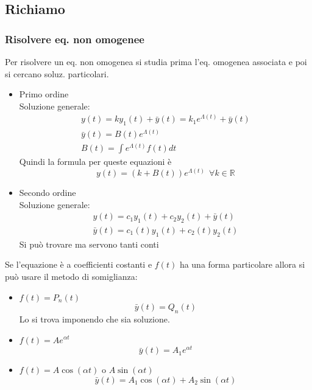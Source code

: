 \subsection{Richiamo}

\subsubsection{Risolvere eq. non omogenee}
Per risolvere un eq. non omogenea si studia prima l'eq. omogenea associata e poi si cercano soluz. particolari.
\begin{itemize}
    \item Primo ordine \\
        Soluzione generale:
        \begin{gather*}
            y(t) = ky_1(t)+ \bar{y}(t) = k_1e^{\Lambda(t)}+ \bar{y}(t) \\
            \bar{y}(t)=B(t)e^{\Lambda(t)} \\
            B(t)=\int e^{\Lambda(t)}f(t)dt
        \end{gather*}
        Quindi la formula per queste equazioni è
        \begin{equation}
            y(t)=(k+B(t))e^{\Lambda(t)}\ \ \forall k\in \mathbb{R}
        \end{equation}
    \item Secondo ordine \\
        Soluzione generale:
        \begin{gather*}
            y(t)=c_1y_1(t)+c_2y_2(t)+ \bar{y}(t) \\
            \bar{y}(t)=c_1(t)y_1(t)+c_2(t)y_2(t)
        \end{gather*}
        Si può trovare ma servono tanti conti \\
\end{itemize}
Se l'equazione è a coefficienti costanti e $f(t)$ ha una forma particolare allora si può usare il metodo di somiglianza:
\begin{itemize}
    \item $f(t)=P_n(t)$
        \begin{equation*}
            \bar{y}(t)=Q_n(t)
        \end{equation*}
        Lo si trova imponendo che sia soluzione.
    \item $f(t)=Ae^{\alpha t}$
        \begin{equation*}
            \bar{y}(t)=A_1e^{\alpha t}
        \end{equation*}
    \item $f(t)=A\cos(\alpha t)$ o $A\sin(\alpha t)$
        \begin{equation*}
            \bar{y}(t)=A_1\cos(\alpha t)+A_2\sin(\alpha t)
        \end{equation*}
\end{itemize}

